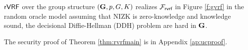 \begin{theorem}\label{thm:rvrfmain}
$ {\mathsf{rVRF}} $  over the group structure $ ({\mathbf{G}},p,G,K) $ realizes $ \mathcal{F}_{\textsf{rvrf}} $ in Figure \ref{f:gvrf} in the random oracle model assuming that NIZK is zero-knowledge and knowledge sound, the decisional Diffie-Hellman (DDH) problem are hard in $ {\mathbf{G}}  $. 
\end{theorem}
The security proof of Theorem \ref{thm:rvrfmain} is in Appendix \ref{ap:ucproof}.





\endinput






\begin{itemize}
\item $\rVRF.\rSign : (\sk,\openring,\msg,\aux) \mapsto \sigma$ takes
 a secret key \sk, a ring opening \openring, a message \msg, and \aux, and then %
 generates \openpk, computes a ring membership proof $\piring$
  $$ \piring = \NIZK \Setst{ \compk, \comring }{
  \exists \openpk,\openring \textrm{\ s.t.\ } 
  \genfrac{}{}{0pt}{}{\PedVRF.\OpenKey(\compk,\openpk) \quad}{\,\, = \rVRF.\OpenKey(\comring,\openring)}
  } $$
 computes the signature
  $$ \sigma = \PedVRF.\Sign(\sk,\openpk,\msg,\aux \doubleplus \compk \doubleplus \piring \doubleplus \comring), \quad\textrm{and} $$ %
 returns the ring VRF signature $\rho = (\compk,\piring,\sigma)$.
\item $\rVRF.\rVerify$ takes $(\comring,\msg,\aux,\rho)$,
 parses $\rho$ as $(\compk,\piring,\sigma,)$,  and then returns
 $$ \PedVRF.\Verify(\compk,\msg,\aux \doubleplus \compk \doubleplus \piring \doubleplus \comring,\sigma) $$
 iff $\NIZK.\Verify(\piring,\compk,\comring)$ succeeds. 
\end{itemize}























